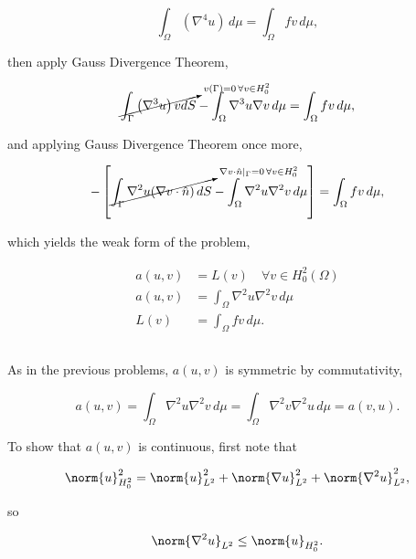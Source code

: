 \documentclass{hw-template}
\newcommand{\intOm}{\int_{\Omega}}
\newcommand{\ltwo}{{L^2}}
\newcommand{\hz}{{H^2_0}}
\begin{document}
\begin{equation}
    \intOm \left(\nabla^4 u\right)\, d\mu = \intOm fv \, d\mu,
\end{equation}

then apply Gauss Divergence Theorem,

\begin{equation}
    \cancelto{^{v(\Gamma) = 0 \,\forall v \in \hz}}{\int_{\Gamma} \left(\nabla^3 u \right) v dS }- \intOm \nabla^3 u \nabla v \, d\mu = \intOm fv \, d\mu,
\end{equation}

and applying Gauss Divergence Theorem once more,

\begin{equation}
    - \left[ \cancelto{^{\nabla v \cdot \hat{n}|_\Gamma = 0 \,\forall v \in \hz}}{\int_\Gamma \nabla^2 u (\nabla v \cdot \hat{n}) \, dS} - \intOm \nabla^2 u \nabla^2 v \, d\mu \right] = \intOm fv \, d\mu,
\end{equation}

which yields the weak form of the problem,

\begin{align}
    a(u, v) &= L(v) \quad \forall v \in \hz(\Omega)\\
    a(u, v)&=\intOm \nabla^2 u \nabla^2 v \, d\mu\\
    L(v) &= \intOm fv \, d\mu.
\end{align}

\subsection{}

As in the previous problems, $a(u, v)$ is symmetric by commutativity,

\begin{equation}
    a(u, v) = \intOm \nabla^2 u \nabla^2 v \, d\mu = \intOm \nabla^2 v \nabla^2 u \, d\mu = a(v, u).
\end{equation}

To show that $a(u, v)$ is continuous, first note that

\begin{equation}
    \norm{u}_\hz^2 = \norm{u}_\ltwo^2 + \norm{\nabla u}_\ltwo^2 + \norm{\nabla^2 u}_\ltwo^2,
\end{equation}

so

\begin{equation}
    \norm{\nabla^2 u}_\ltwo \leq \norm{u}_\hz.\label{eq:p4-inequality}
\end{equation}
\end{document}
